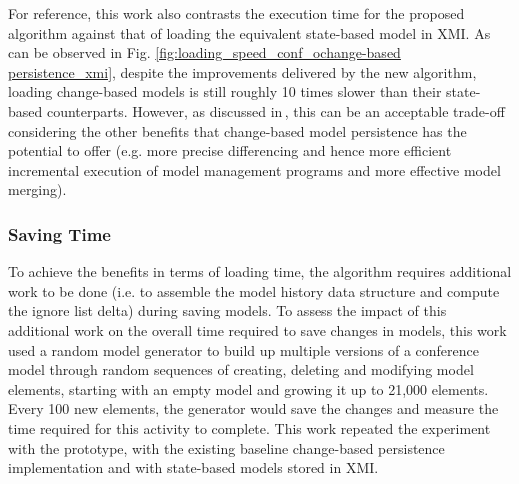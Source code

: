 \documentclass[12pt, a4paper]{report} \usepackage[titletoc]{appendix}
\begin{document}
For reference, this work also contrasts the execution time for the proposed algorithm against that of loading the equivalent state-based model in XMI. As can be observed in Fig. \ref{fig:loading_speed_conf_ochange-based persistence_xmi}, despite the improvements delivered by the new algorithm, loading change-based models is still roughly 10 times slower than their state-based counterparts. However, as discussed in\,\cite{yohannis2017turning}, this can be an acceptable trade-off considering the other benefits that change-based model persistence has the potential to offer (e.g. more precise differencing and hence more efficient incremental execution of model management programs and more effective model merging).

\subsubsection{Saving Time}
\label{subsec:saving_time_test}

To achieve the benefits in terms of loading time, the algorithm requires additional work to be done (i.e. to assemble the model history data structure and compute the ignore list delta) during saving models. To assess the impact of this additional work on the overall time required to save changes in models, this work used a random model generator to build up multiple versions of a conference model through random sequences of creating, deleting and modifying model elements, starting with an empty model and growing it up to 21,000 elements. Every 100 new elements, the generator would save the changes and measure the time required for this activity to complete. This work repeated the experiment with the prototype, with the existing baseline change-based persistence implementation and with state-based models stored in XMI.
\end{document}

